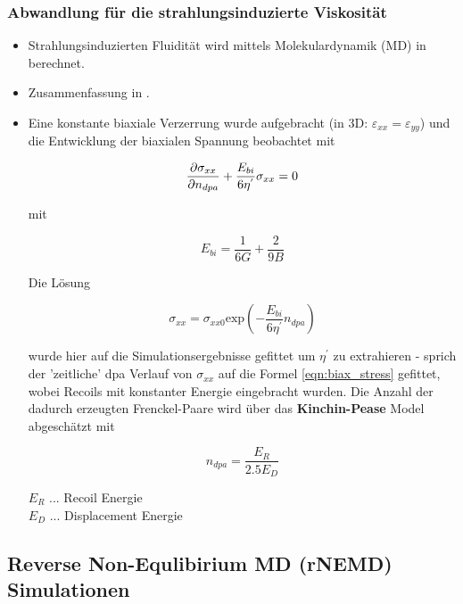 \documentclass[a4paper, 10pt, 
               numbers=noenddot, toc=graduated,
               headsepline=true, footsepline=true,
               twoside=false, titlepage=true, 
               bibliography=totoc]{scrartcl}
\begin{document}
	\subsubsection{Abwandlung für die strahlungsinduzierte Viskosität}
	\begin{itemize}

 		 \item Strahlungsinduzierten Fluidität wird mittels Molekulardynamik (MD) in \cite{Mayr2003} berechnet. 
  		 \item Zusammenfassung in \cite{hobler2017hpm}.
  
  		  \item Eine konstante biaxiale Verzerrung wurde aufgebracht (in 3D: $\varepsilon_{xx} = \varepsilon_{yy}$) und die Entwicklung der biaxialen Spannung beobachtet mit 

   		 	\begin{equation}
	    		\pdv{\sigma_{xx}}{n_{dpa}} + \frac{E_{bi}}{6\eta^{'}}\sigma_{xx} = 0
    		\end{equation}

    		mit 

    		\begin{equation}
	   		 	E_{bi} = \frac{1}{6G} + \frac{2}{9B} 
    		\end{equation}

   			 Die Lösung 

    		\begin{equation}\label{eqn:biax_stress}
	    		\sigma_{xx} = \sigma_{xx0} \mathrm{exp} \left( -\frac{E_{bi}}{6\eta^{'}} n_{dpa} \right) 
    		\end{equation}

   			 wurde hier auf die Simulationsergebnisse gefittet um $\eta^{'}$ zu extrahieren - sprich der 'zeitliche' dpa Verlauf von $\sigma_{xx}$ auf die Formel \ref{eqn:biax_stress} gefittet, wobei Recoils mit konstanter Energie eingebracht wurden. Die Anzahl der dadurch erzeugten Frenckel-Paare wird über das \textbf{Kinchin-Pease} Model abgeschätzt mit 

   			 \begin{equation}
	   		 	n_{dpa} = \frac{E_R}{2.5 E_D}
   			 \end{equation}

    		$E_R$ ... Recoil Energie\\
   			 $E_D$ ... Displacement Energie
    
    \end{itemize}
    

\subsection{Reverse Non-Equlibirium MD  (rNEMD) Simulationen}
\end{document}
